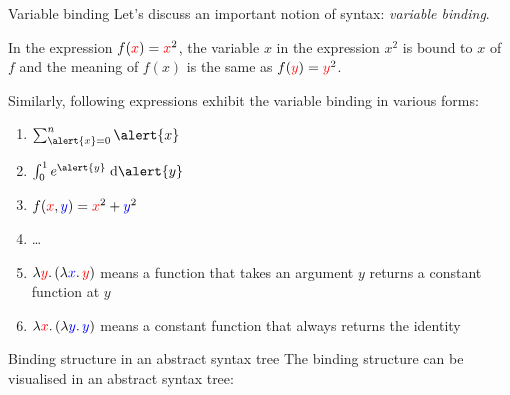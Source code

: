\begin{frame}{Variable binding}
  Let's discuss an important notion of syntax: \emph{variable binding}.

  In the expression $f({\color{red}{x}}) = {\color{red}x}^2$, the variable $x$ in the expression $x^2$ is \alert{bound} to $x$ of $f$ and the \alert{meaning} of $f(x)$ is the same as $f({\color{red}y}) = {\color{red}y}^2$.

  Similarly, following expressions exhibit the variable binding in various forms:
  \begin{enumerate}
    \item $\sum_{\alert{x} = 0}^{n} \alert{x}$
    \item $\int_{0}^{1} e^{\alert{y}}\; \mathrm{d}\alert{y}$
    \item $f({\color{red}x}, {\color{blue}y}) = {\color{red}x}^2 + {\color{blue}y}^2$
    \item \dots
    \item $\lambda {\color{red}y}.\,(\lambda {\color{blue}x}.\, {\color{red}y})$ means a function that takes an argument $y$ returns a constant function at $y$
    \item $\lambda {\color{red}x}.\,(\lambda {\color{blue}y}.\, {\color{blue}y})$ means a constant function that always returns the identity
  \end{enumerate}
\end{frame}

\begin{frame}{Binding structure in an abstract syntax tree}
  The binding structure can be visualised in an abstract syntax tree:
  \begin{center}
  \end{center}
\end{frame}

